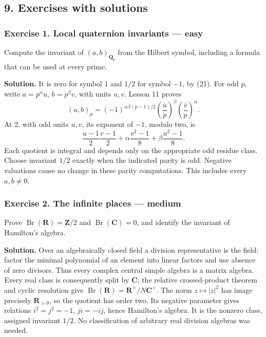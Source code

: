 \documentclass[11pt,a4paper]{article}
\begin{document}
\subsection{9. Exercises with solutions}\label{exercises-with-solutions}

\subsubsection{Exercise 1. Local quaternion invariants ---
easy}\label{exercise-1.-local-quaternion-invariants-easy}

Compute the invariant of \((a,b)_{\mathbf Q_p}\) from the Hilbert
symbol, including a formula that can be used at every prime.

\textbf{Solution.} It is zero for symbol 1 and \(1/2\) for symbol
\(-1\), by (21). For odd \(p\), write \(a=p^\alpha u\), \(b=p^\beta v\),
with units \(u,v\). Lesson 11 proves \[
(a,b)_p=(-1)^{\alpha\beta(p-1)/2}
\left(\frac{\bar u}{p}\right)^\beta
\left(\frac{\bar v}{p}\right)^\alpha.
\] At 2, with odd units \(u,v\), its exponent of \(-1\), modulo two, is
\[
\frac{u-1}{2}\frac{v-1}{2}
+\alpha\frac{v^2-1}{8}+\beta\frac{u^2-1}{8}.
\] Each quotient is integral and depends only on the appropriate odd
residue class. Choose invariant \(1/2\) exactly when the indicated
parity is odd. Negative valuations cause no change in these parity
computations. This includes every \(a,b\ne0\).

\subsubsection{Exercise 2. The infinite places ---
medium}\label{exercise-2.-the-infinite-places-medium}

Prove \(\operatorname{Br}(\mathbf R)=\mathbf Z/2\) and
\(\operatorname{Br}(\mathbf C)=0\), and identify the invariant of
Hamilton's algebra.

\textbf{Solution.} Over an algebraically closed field a division
representative is the field: factor the minimal polynomial of an element
into linear factors and use absence of zero divisors. Thus every complex
central simple algebra is a matrix algebra. Every real class is
consequently split by \(\mathbf C\); the relative crossed-product
theorem and cyclic resolution give
\(\operatorname{Br}(\mathbf R)=\mathbf R^\times/N\mathbf C^\times\). The
norm \(z\mapsto |z|^2\) has image precisely \(\mathbf R_{>0}\), so the
quotient has order two. Its negative parameter gives relations
\(i^2=j^2=-1\), \(ji=-ij\), hence Hamilton's algebra. It is the nonzero
class, assigned invariant \(1/2\). No classification of arbitrary real
division algebras was needed.
\end{document}
